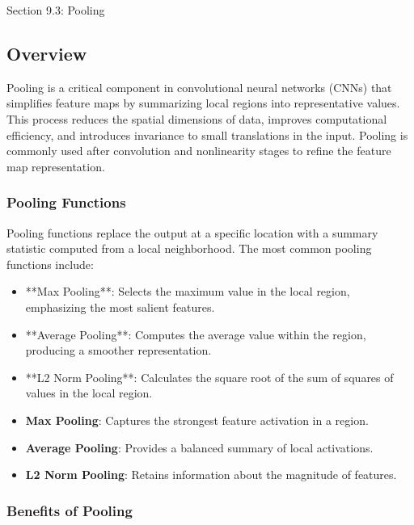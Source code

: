 \begin{notes}{Section 9.3: Pooling}
    \subsection*{Overview}

    Pooling is a critical component in convolutional neural networks (CNNs) that simplifies feature maps by summarizing local regions into representative values. This process reduces the spatial dimensions 
    of data, improves computational efficiency, and introduces invariance to small translations in the input. Pooling is commonly used after convolution and nonlinearity stages to refine the feature map 
    representation.
    
    \subsubsection*{Pooling Functions}
    
    Pooling functions replace the output at a specific location with a summary statistic computed from a local neighborhood. The most common pooling functions include:
    
    \begin{itemize}
        \item **Max Pooling**: Selects the maximum value in the local region, emphasizing the most salient features.
        \item **Average Pooling**: Computes the average value within the region, producing a smoother representation.
        \item **L2 Norm Pooling**: Calculates the square root of the sum of squares of values in the local region.
    \end{itemize}
    
    \begin{highlight}
        \begin{itemize}
            \item \textbf{Max Pooling}: Captures the strongest feature activation in a region.
            \item \textbf{Average Pooling}: Provides a balanced summary of local activations.
            \item \textbf{L2 Norm Pooling}: Retains information about the magnitude of features.
        \end{itemize}
    \end{highlight}
    
    \subsubsection*{Benefits of Pooling}
    

\end{notes}
